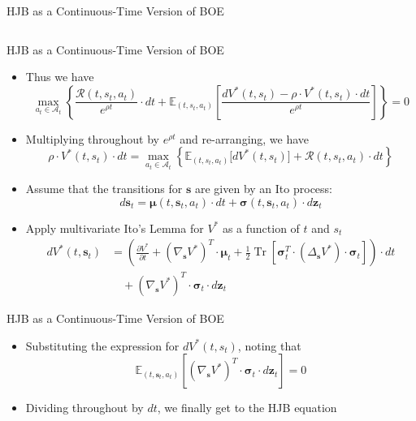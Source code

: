 \documentclass[UTF8, 10pt]{beamer}
\begin{document}
\begin{CJK*}{UTF8}{gbsn}
\begin{frame}{HJB as a Continuous-Time Version of BOE}
\begin{itemize}
$$			$$
	\end{itemize}
\end{frame}
\begin{frame}{HJB as a Continuous-Time Version of BOE}
	\begin{itemize}
		\item Thus we have
			$$
			\max _{a_{t} \in \mathcal{A}_{t}}\left\{\frac{\mathcal{R}\left(t, s_{t}, a_{t}\right)}{e^{\rho t}} \cdot d t+\mathbb{E}_{\left(t, s_{t}, a_{t}\right)}\left[\frac{d V^{*}\left(t, s_{t}\right)-\rho \cdot V^{*}\left(t, s_{t}\right) \cdot d t}{e^{\rho t}}\right]\right\}=0
			$$
		\item Multiplying throughout by $e^{\rho t}$ and re-arranging, we have
			$$
			\rho \cdot V^{*}\left(t, s_{t}\right) \cdot d t=\max _{a_{t} \in \mathcal{A}_{t}}\left\{\mathbb{E}_{\left(t, s_{t}, a_{t}\right)}\Big[d V^{*}\left(t, s_{t}\right)\Big]+\mathcal{R}\left(t, s_{t}, a_{t}\right) \cdot d t\right\}
			$$
		\item Assume that the transitions for $\boldsymbol{s}$ are given by an Ito process:
			$$
			d \boldsymbol{s}_{t}=\boldsymbol{\mu}\left(t, \boldsymbol{s}_{t}, a_{t}\right) \cdot d t+\boldsymbol{\sigma}\left(t, \boldsymbol{s}_{t}, a_{t}\right) \cdot d \boldsymbol{z}_{t}
			$$
		\item Apply multivariate Ito’s Lemma for $V^*$ as a function of $t$ and $s_t$
			$$
			\begin{aligned}
			d V^{*}\left(t, \boldsymbol{s}_{t}\right)
			&=\left(\frac{\partial V^{*}}{\partial t}+\left(\nabla_{\boldsymbol{s}} V^{*}\right)^{T} \cdot \boldsymbol{\mu}_{t}+\frac{1}{2} \operatorname{Tr}\left[\boldsymbol{\sigma}_{t}^{T} \cdot\left(\Delta_{\boldsymbol{s}} V^{*}\right) \cdot \boldsymbol{\sigma}_{t}\right]\right) \cdot d t
			\\&\quad+\left(\nabla_{\boldsymbol{s}} V^{*}\right)^{T} \cdot \boldsymbol{\sigma}_{t} \cdot d \boldsymbol{z}_{t}
			\end{aligned}
			$$
	\end{itemize}
\end{frame}
\begin{frame}{HJB as a Continuous-Time Version of BOE}
	\begin{itemize}
		\item Substituting the expression for $d V^{*}(t, s_t)$, noting that
			$$\mathbb{E}_{\left(t, \boldsymbol{s}_{t}, a_{t}\right)}\left[\left(\nabla_{\boldsymbol{s}} V^{*}\right)^{T} \cdot \boldsymbol{\sigma}_{t} \cdot d \boldsymbol{z}_{t}\right]=0$$
		\item Dividing throughout by $d t$, we finally get to the \alert{HJB equation}

\end{itemize}
\end{frame}
\end{CJK*}
\end{document}
